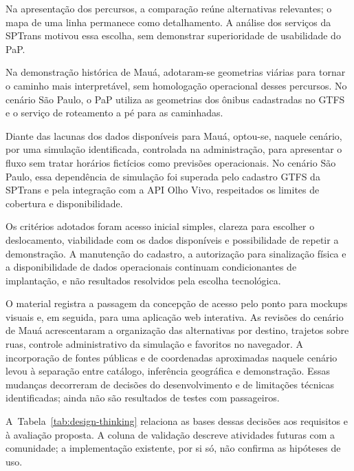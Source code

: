 Na apresentação dos percursos, a comparação reúne alternativas relevantes; o mapa de uma linha permanece como detalhamento. A análise dos serviços da SPTrans motivou essa escolha, sem demonstrar superioridade de usabilidade do PaP.

Na demonstração histórica de Mauá, adotaram-se geometrias viárias para tornar o caminho mais interpretável, sem homologação operacional desses percursos. No cenário São Paulo, o PaP utiliza as geometrias dos ônibus cadastradas no GTFS e o serviço de roteamento a pé para as caminhadas.

Diante das lacunas dos dados disponíveis para Mauá, optou-se, naquele cenário, por uma simulação identificada, controlada na administração, para apresentar o fluxo sem tratar horários fictícios como previsões operacionais. No cenário São Paulo, essa dependência de simulação foi superada pelo cadastro GTFS da SPTrans e pela integração com a API Olho Vivo, respeitados os limites de cobertura e disponibilidade.

Os critérios adotados foram acesso inicial simples, clareza para escolher o deslocamento, viabilidade com os dados disponíveis e possibilidade de repetir a demonstração. A manutenção do cadastro, a autorização para sinalização física e a disponibilidade de dados operacionais continuam condicionantes de implantação, e não resultados resolvidos pela escolha tecnológica.

O material registra a passagem da concepção de acesso pelo ponto para mockups visuais e, em seguida, para uma aplicação web interativa. As revisões do cenário de Mauá acrescentaram a organização das alternativas por destino, trajetos sobre ruas, controle administrativo da simulação e favoritos no navegador. A incorporação de fontes públicas e de coordenadas aproximadas naquele cenário levou à separação entre catálogo, inferência geográfica e demonstração. Essas mudanças decorreram de decisões do desenvolvimento e de limitações técnicas identificadas; ainda não são resultados de testes com passageiros.

A~Tabela~\ref{tab:design-thinking} relaciona as bases dessas decisões aos requisitos e à avaliação proposta. A coluna de validação descreve atividades futuras com a comunidade; a implementação existente, por si só, não confirma as hipóteses de uso.

